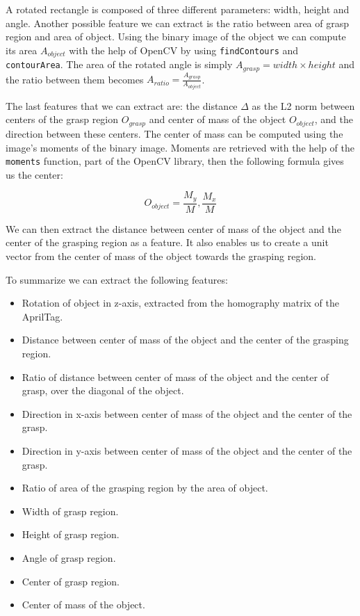 A rotated rectangle is composed of three different parameters: width, height and angle. Another possible feature we can extract is the ratio between area of grasp region and area of object. Using the binary image of the object we can compute its area \(A_{object}\) with the help of OpenCV by using \texttt{findContours} and \texttt{contourArea}. The area of the rotated angle is simply \(A_{grasp} = width \times height\) and the ratio between them becomes \(A_{ratio} = \frac{A_{grasp}}{A_{object}} \).

The last features that we can extract are: the distance \(\Delta\) as the L2 norm between centers of the grasp region \(O_{grasp}\) and center of mass of the object \(O_{object}\), and the direction between these centers. The center of mass can be computed using the image's moments of the binary image. Moments are retrieved with the help of the \texttt{moments} function, part of the OpenCV library, then the following formula gives us the center:

\[
	O_{object} = \frac{M_y}{M}, \frac{M_x}{M}
\]

We can then extract the distance between center of mass of the object and the center of the grasping region as a feature. It also enables us to create a unit vector from the center of mass of the object towards the grasping region.

To summarize we can extract the following features:
\begin{itemize}
	\item Rotation of object in z-axis, extracted from the homography matrix of the AprilTag.
	\item Distance between center of mass of the object and the center of the grasping region.
	\item Ratio of distance between center of mass of the object and the center of grasp, over the diagonal of the object.
	\item Direction in x-axis between center of mass of the object and the center of the grasp.
	\item Direction in y-axis between center of mass of the object and the center of the grasp.
	\item Ratio of area of the grasping region by the area of object.
	\item Width of grasp region.
	\item Height of grasp region.
	\item Angle of grasp region.
	\item Center of grasp region.
	\item Center of mass of the object.
\end{itemize}

